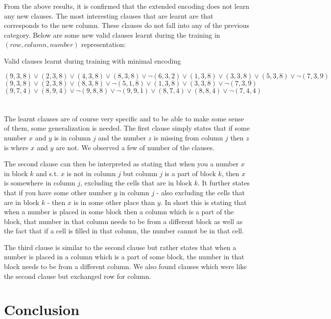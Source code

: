 \documentclass{article}
\begin{document}
From the above results, it is confirmed that the extended encoding does not learn any new clauses. The most interesting clauses that are learnt are that corresponds to the new column. These clauses do not fall into any of the previous category. Below are some new valid clauses learnt during the training in $(row, column, number)$ representation:

\begin{center}
Valid clauses learnt during training with minimal encoding
\end{center}
\[(9, 3, 8) \lor (2, 3, 8) \lor (4, 3, 8) \lor (8, 3, 8) \lor \neg (6, 3, 2) \lor (1, 3, 8) \lor (3, 3, 8) \lor (5, 3, 8) \lor \neg (7, 3, 9)\]
\[(9, 3, 8 ) \lor (2, 3, 8 ) \lor (8, 3, 8 ) \lor \neg (5, 1, 8 ) \lor (1, 3, 8 ) \lor (3, 3, 8 ) \lor \neg (7, 3, 9 ) \]
\[(9, 7, 4) \lor (8, 9, 4) \lor \neg (9, 8, 8) \lor \neg (9, 9, 1) \lor (8, 7, 4) \lor (8, 8, 4) \lor \neg (7, 4, 4)\] \\\\

The learnt clauses are of course very specific and to be able to make some sense of them, some generalization is needed. The first clause simply states that if some number $x$ and $y$ is in column $j$ and the number $z$ is missing from column $j$ then $z$ is where $x$ and $y$ are not. We observed a few of number of the clauses.

The second clause can then be interpreted as stating that when you a number $x$ in block $k$ and s.t. $x$ is not in column $j$ but column $j$ is a part of block $k$, then $x$ is somewhere in column $j$, excluding the cells that are in block $k$. It further states that if you have some other number $y$ in column $j$ - also excluding the cells that are in block $k$ - then $x$ is in some other place than $y$. In short this is stating that when a number is placed in some block then a column which is a part of the block, that number in that column needs to be from a different block as well as the fact that if a cell is filled in that column, the number cannot be in that cell.

The third clause is similar to the second clause but rather states that when a number is placed in a column which is a part of some block, the number in that block needs to be from a different column. We also found clauses which were like the second clause but exchanged row for column.

\section{Conclusion} \label{conclusion}




\end{document}
